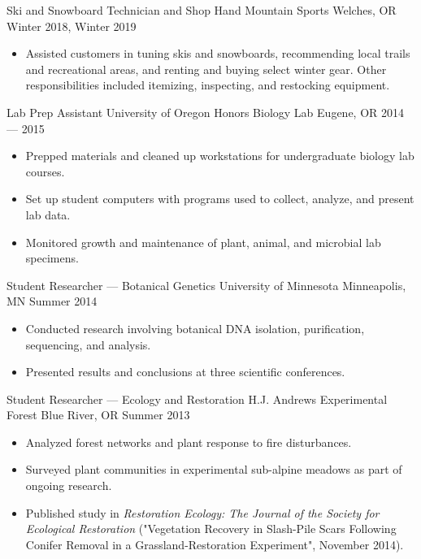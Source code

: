 \showoff
{Ski and Snowboard Technician and Shop Hand}
{Mountain Sports}
{Welches, OR}
{Winter 2018, Winter 2019}
\begin{itemize}[label=$\triangleright$]
    \item Assisted customers in tuning skis and snowboards, recommending local trails and recreational areas, and renting and buying select winter gear. Other responsibilities included itemizing, inspecting, and restocking equipment.
\end{itemize}

\myBreak

\showoff
{Lab Prep Assistant}
{University of Oregon Honors Biology Lab}
{Eugene, OR}
{2014 --- 2015}
\begin{itemize}[label=$\triangleright$]
    \item Prepped materials and cleaned up workstations for undergraduate biology lab courses.
    \item Set up student computers with programs used to collect, analyze, and present lab data.
    \item Monitored growth and maintenance of plant, animal, and microbial lab specimens.
\end{itemize}

\myBreak

\showoff
{Student Researcher --- Botanical Genetics}
{University of Minnesota}
{Minneapolis, MN}
{Summer 2014}
\begin{itemize}[label=$\triangleright$]
    \item Conducted research involving botanical DNA isolation, purification, sequencing, and analysis.
    \item Presented results and conclusions at three scientific conferences.
\end{itemize}

\myBreak

\showoff
{Student Researcher --- Ecology and Restoration}
{H.J. Andrews Experimental Forest}
{Blue River, OR}
{Summer 2013}
\begin{itemize}[label=$\triangleright$]
    \item Analyzed forest networks and plant response to fire disturbances.
    \item Surveyed plant communities in experimental sub-alpine meadows as part of ongoing research.
    \item Published study in \textit{Restoration Ecology: The Journal of the Society for Ecological Restoration} ("Vegetation Recovery in Slash-Pile Scars Following Conifer Removal in a Grassland-Restoration Experiment", November 2014).
\end{itemize}

